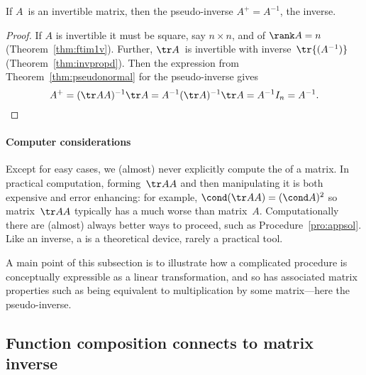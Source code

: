 \begin{theorem} \label{thm:}
If \(A\)~is an invertible matrix, then the pseudo-inverse \(A^+=A^{-1}\), the inverse.
\end{theorem}
\begin{proof} 
If \(A\) is invertible it must be square, say \(n\times n\), and of \(\rank A=n\) (Theorem~\ref{thm:ftim1v}).
Further, \(\tr A\)~is invertible with inverse~\(\tr{(A^{-1})}\) (Theorem~\ref{thm:invpropd}).
Then the expression from Theorem~\ref{thm:pseudonormal} for the pseudo-inverse gives
\begin{equation*}
A^+=(\tr AA)^{-1}\tr A
=A^{-1}(\tr A)^{-1}\tr A
=A^{-1}I_n=A^{-1}.
\end{equation*}
\end{proof}




\paragraph{Computer considerations} 
Except for easy cases, we (almost) never explicitly compute the  of a matrix.
In practical computation, forming~\(\tr AA\) and then manipulating it is both expensive and error enhancing: for example, \(\cond(\tr AA)=(\cond A)^2\) so matrix~\(\tr AA\) typically has a much worse  than matrix~\(A\).
Computationally there are (almost) always better ways to proceed, such as Procedure~\ref{pro:appsol}.
Like an inverse, a  is a theoretical device, rarely a practical tool.

A main point of this subsection is to illustrate how a complicated procedure is conceptually expressible as a linear transformation, and so has associated matrix properties such as being equivalent to multiplication by some matrix---here the pseudo-inverse.







\begin{comment}
connect to normal equation?  Possibly establish the Penrose conditions, \(AA^+A=A\), \(A^+AA^+=A^+\), and \(AA^+\) and \(A^+A\) are symmetric, but as yet I do not see any need.
\end{comment}







\subsection{Function composition connects to matrix inverse}


